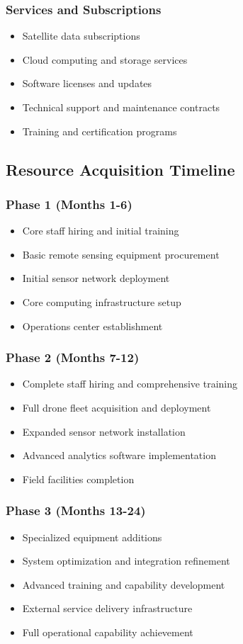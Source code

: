 \subsubsection{Services and Subscriptions}
\begin{itemize}
    \item Satellite data subscriptions
    \item Cloud computing and storage services
    \item Software licenses and updates
    \item Technical support and maintenance contracts
    \item Training and certification programs
\end{itemize}

\subsection{Resource Acquisition Timeline}

\subsubsection{Phase 1 (Months 1-6)}
\begin{itemize}
    \item Core staff hiring and initial training
    \item Basic remote sensing equipment procurement
    \item Initial sensor network deployment
    \item Core computing infrastructure setup
    \item Operations center establishment
\end{itemize}

\subsubsection{Phase 2 (Months 7-12)}
\begin{itemize}
    \item Complete staff hiring and comprehensive training
    \item Full drone fleet acquisition and deployment
    \item Expanded sensor network installation
    \item Advanced analytics software implementation
    \item Field facilities completion
\end{itemize}

\subsubsection{Phase 3 (Months 13-24)}
\begin{itemize}
    \item Specialized equipment additions
    \item System optimization and integration refinement
    \item Advanced training and capability development
    \item External service delivery infrastructure
    \item Full operational capability achievement
\end{itemize} 